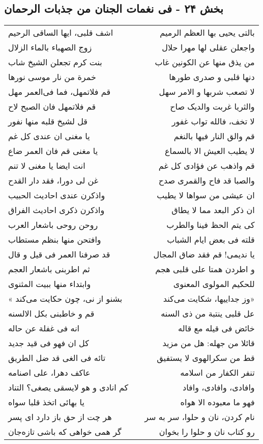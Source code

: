 \begin{center}
\section*{بخش ۲۴ - فی نغمات الجنان من جذبات الرحمان}
\label{sec:024}
\begin{longtable}{l p{0.5cm} r}
اشف قلبی، ایها الساقی الرحیم
&&
بالتی یحیی بها العظم الرمیم
\\
زوج الصهباء بالماء الزلال
&&
واجعلن عقلی لها مهرا حلال
\\
بنت کرم تجعلن الشیخ شاب
&&
من یذق منها عن الکونین غاب
\\
خمرة من نار موسی نورها
&&
دنها قلبی و صدری طورها
\\
قم فلاتمهل، فما فی‌العمر مهل
&&
لا تصعب شربها و الامر سهل
\\
قم فلاتمهل فان الصبح لاح
&&
والثریا غربت والدیک صاح
\\
قل لشیخ قلبه منها نفور
&&
لا تخف، فالله تواب غفور
\\
یا مغنی ان عندی کل غم
&&
قم والق النار فیها بالنغم
\\
یا مغنی قم فان العمر ضاع
&&
لا یطیب العیش الا بالسماع
\\
انت ایضا یا مغنی لا تنم
&&
قم واذهب عن فؤادی کل غم
\\
غن لی دورا، فقد دار القدح
&&
والصبا قد فاح والقمری صدح
\\
واذکرن عندی احادیث الحبیب
&&
ان عیشی من سواها لا یطیب
\\
واذکرن ذکری احادیث الفراق
&&
ان ذکر البعد مما لا یطاق
\\
روحن روحی باشعار العرب
&&
کی یتم الحظ فینا والطرب
\\
وافتحن منها بنظم مستطاب
&&
قلته فی بعض ایام الشباب
\\
قد صرفنا العمر فی قیل و قال
&&
یا ندیمی! قم فقد ضاق المجال
\\
ثم اطربنی باشعار العجم
&&
و اطردن همتا علی قلبی هجم
\\
وابتداء منها ببیت المثنوی
&&
للحکیم المولوی المعنوی
\\
« بشنو از نی، چون حکایت می‌کند
&&
وز جداییها، شکایت می‌کند»
\\
قم و خاطبنی بکل الالسنه
&&
عل قلبی ینتبة من ذی السنه
\\
انه فی غفلة عن حاله
&&
خائض فی قیله مع قاله
\\
کل ان فهو فی قید جدید
&&
قائلا من جهله: هل من مزید
\\
تائه فی الغی قد ضل الطریق
&&
قط من سکرالهوی لا یستفیق
\\
عاکف دهرا، علی اصنامه
&&
تنفر الکفار من اسلامه
\\
کم انادی و هو لایسقی یصغی؟ التناد
&&
وافادی، وافادی، وافاد
\\
یا بهائی اتخذ قلبا سواه
&&
فهو ما معبوده الا هواه
\\
هر چت از حق باز دارد ای پسر
&&
نام کردن، نان و حلوا، سر به سر
\\
گر همی خواهی که باشی تازه‌جان
&&
رو کتاب نان و حلوا را بخوان
\\
\end{longtable}
\end{center}
